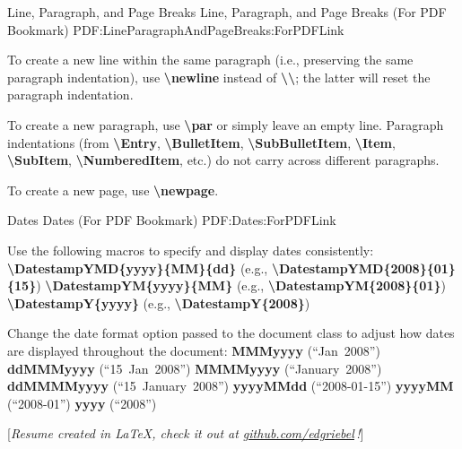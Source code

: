\documentclass[letterpaper,MMMMyyyy,nonstopmode]{simpleresumecv}
\newcommand{\CVNote}{Resume created in \LaTeX, check it out at \href{https://github.com/edgriebel/resume-cv}{\underline{github.com/edgriebel}}\,!}
\newcommand{\Code}[1]{\mbox{\textbf{#1}}}
\newcommand{\CodeCommand}[1]{\mbox{\textbf{\textbackslash{#1}}}}
\begin{document}
\begin{Body}
\BigGap
\SubSection
{Line, Paragraph, and Page Breaks}
{Line, Paragraph, and Page Breaks (For PDF Bookmark)}
{PDF:LineParagraphAndPageBreaks:ForPDFLink}

\Gap
\BulletItem
To create a new line within the same paragraph (i.e., preserving the same paragraph indentation), use \CodeCommand{newline} instead of \CodeCommand{\textbackslash};
the latter will reset the paragraph indentation.

\Gap
\BulletItem
To create a new paragraph, use \CodeCommand{par} or simply leave an empty line.
Paragraph indentations (from
\CodeCommand{Entry},
\CodeCommand{BulletItem},
\CodeCommand{SubBulletItem},
\CodeCommand{Item},
\CodeCommand{SubItem},
\CodeCommand{NumberedItem},
etc.) do not carry across different paragraphs.

\Gap
\BulletItem
To create a new page, use \CodeCommand{newpage}.

\BigGap
\SubSection
{Dates}
{Dates (For PDF Bookmark)}
{PDF:Dates:ForPDFLink}

\Gap
\BulletItem
Use the following macros to specify and display dates consistently:
\SubBulletItem
\CodeCommand{DatestampYMD\{yyyy\}\{MM\}\{dd\}}
(e.g., \CodeCommand{DatestampYMD\{2008\}\{01\}\{15\}})
\SubBulletItem
\CodeCommand{DatestampYM\{yyyy\}\{MM\}}
(e.g., \CodeCommand{DatestampYM\{2008\}\{01\}})
\SubBulletItem
\CodeCommand{DatestampY\{yyyy\}}
(e.g., \CodeCommand{DatestampY\{2008\}})

\Gap
\BulletItem
Change the date format option passed to the document class to adjust how dates are displayed throughout the document:
\SubBulletItem
\Code{MMMyyyy} (``Jan~2008'')
\SubBulletItem
\Code{ddMMMyyyy} (``15~Jan~2008'')
\SubBulletItem
\Code{MMMMyyyy} (``January~2008'')
\SubBulletItem
\Code{ddMMMMyyyy} (``15~January~2008'')
\SubBulletItem
\Code{yyyyMMdd} (``2008-01-15'')
\SubBulletItem
\Code{yyyyMM} (``2008-01'')
\SubBulletItem
\Code{yyyy} (``2008'')

\endgroup

\fi

\end{Body}


\UseNoteFont%
\null\hfill%
[\textit{\CVNote}]
\end{document}
